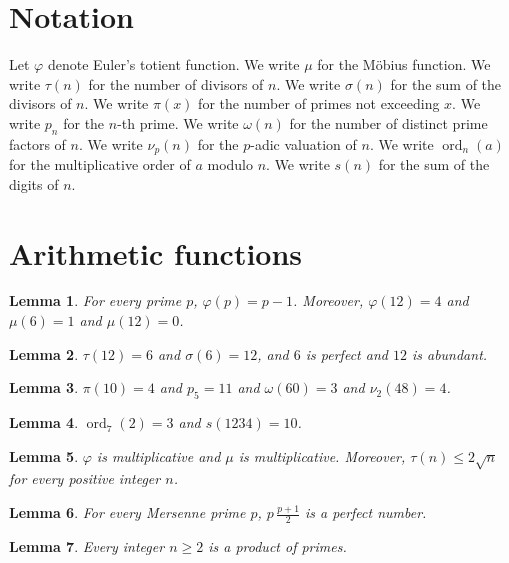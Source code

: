 \documentclass{article}
\newtheorem{lemma}{Lemma}
\begin{document}
\section{Notation}

Let $\varphi$ denote Euler's totient function.
We write $\mu$ for the M\"obius function.
We write $\tau(n)$ for the number of divisors of $n$.
We write $\sigma(n)$ for the sum of the divisors of $n$.
We write $\pi(x)$ for the number of primes not exceeding $x$.
We write $p_n$ for the $n$-th prime.
We write $\omega(n)$ for the number of distinct prime factors of $n$.
We write $\nu_p(n)$ for the $p$-adic valuation of $n$.
We write $\operatorname{ord}_n(a)$ for the multiplicative order of $a$ modulo $n$.
We write $s(n)$ for the sum of the digits of $n$.

\section{Arithmetic functions}

\begin{lemma}\label{totient}
For every prime $p$, $\varphi(p)=p-1$. Moreover, $\varphi(12)=4$ and $\mu(6)=1$ and $\mu(12)=0$.
\end{lemma}

\begin{lemma}\label{divisors}
$\tau(12)=6$ and $\sigma(6)=12$, and $6$ is perfect and $12$ is abundant.
\end{lemma}

\begin{lemma}\label{primes}
$\pi(10)=4$ and $p_5=11$ and $\omega(60)=3$ and $\nu_2(48)=4$.
\end{lemma}

\begin{lemma}\label{order}
$\operatorname{ord}_7(2)=3$ and $s(1234)=10$.
\end{lemma}

\begin{lemma}\label{multiplicative}
$\varphi$ is multiplicative and $\mu$ is multiplicative. Moreover, $\tau(n)\le2\sqrt{n}$ for every positive integer $n$.
\end{lemma}

\begin{lemma}\label{mersenne}
For every Mersenne prime $p$, $p\,\frac{p+1}{2}$ is a perfect number.
\end{lemma}

\begin{lemma}\label{prime-factorization}
Every integer $n\ge2$ is a product of primes.
\end{lemma}
\end{document}
